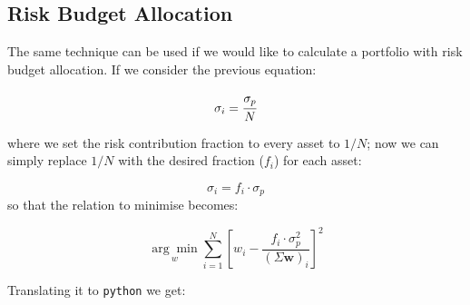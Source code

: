 \subsection{Risk Budget Allocation}\label{risk-budget-allocation}

The same technique can be used if we would like to calculate a portfolio
with risk budget allocation. If we consider the previous equation:

\[ \sigma _{i}=\cfrac{\sigma_p}{N} \]

where we set the risk contribution fraction to every asset to \(1/N\);
now we can simply replace \(1/N\) with the desired fraction (\(f_i\))
for each asset:

\[ \sigma _{i}=f_i \cdot \sigma_p \]
so that the relation to minimise becomes:

\[ \underset{w}{\arg \min } \sum _{i=1}^{N}\left[w_{i}-{\frac {f_i \cdot \sigma_p^{2}}{(\Sigma \mathbf{w})_{i}}}\right]^{2} \]

Translating it to \texttt{python} we get:

